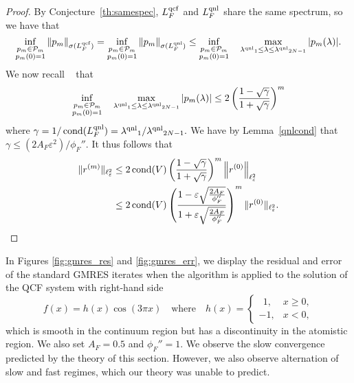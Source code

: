 \documentclass[12pt,reqno]{amsart}
\begin{document}
\begin{proof}
By Conjecture~\ref{th:samespec}, ${L^{{\rm qcf}}_F}$ and ${L^{{\rm qnl}}_F}$ share the same
spectrum, so we have that
\[
\inf_{\substack{p_{m} \in {\mathcal{P}}_{m}\\
p_m (0) = 1}} \| p_m \|_{\sigma({L^{{\rm qcf}}_F})}
=\inf_{\substack{p_{m} \in {\mathcal{P}}_{m}\\
p_m (0) = 1}} \| p_m \|_{\sigma({L^{{\rm qnl}}_F})}
\le
\inf_{\substack{p_{m} \in {\mathcal{P}}_{m}\\
p_m (0) = 1}}\quad\max_{{\lambda^{{\rm qnl}}}_{1} \leq \lambda \leq {\lambda^{{\rm qnl}}}_{2N-1}} |p_m(\lambda)|.
\]
We now recall ~\cite{saad} that
$$
\inf_{\substack{p_m \in {\mathcal{P}}_{m}\\
p_m (0) = 1}}\quad\max_{{\lambda^{{\rm qnl}}}_{1} \leq \lambda \leq {\lambda^{{\rm qnl}}}_{2N-1}} |p_m
(\lambda)|
\leq
2\left(\frac{1-\sqrt{\gamma}}{1+\sqrt{\gamma}}\right)^{m}
$$
where $\gamma=1/\operatorname{cond}({L^{{\rm qnl}}_F})={\lambda^{{\rm qnl}}}_{1}/{\lambda^{{\rm qnl}}}_{2N-1}.$
We have
by Lemma~\ref{qnlcond} that $\gamma
\le(2A_F{\varepsilon}^2)/\phi_{F}''.$
It thus follows that
\begin{equation*}
\begin{split}
\|r^{(m)}\|_{\ell^2_{\varepsilon}}&\le
2 \operatorname{cond}(V) \left(\frac{1-\sqrt{\gamma}}{1+\sqrt{\gamma}}\right)^{m}
\left\|r^{(0)}\right\|_{\ell^2_{\varepsilon}}
\\
&\le 2 \operatorname{cond}(V) \left(\frac{1-{\varepsilon}\sqrt{\frac{2A_F}{\phi_{F}''}}}{1+{\varepsilon}\sqrt{\frac{2A_F}{\phi_{F}''}}}\right)^{m}
\|r^{(0)}\|_{\ell^2_{\varepsilon}}.\qedhere
\end{split}
\end{equation*}
\end{proof}

In Figures \ref{fig:gmres_res} and \ref{fig:gmres_err}, we display the
residual and error of the standard GMRES iterates when the algorithm
is applied to the solution of the QCF system with right-hand side
\begin{equation}
  \label{eq:num_ex_rhs}
  f(x) = h(x) \cos(3 \pi x) \quad \text{where} \quad
  h(x) = \begin{cases}
    \ \ 1, & x \geq 0, \\
    -1, & x < 0,
  \end{cases}
\end{equation}
which is smooth in the continuum region but has a discontinuity in the
atomistic region.
We also set $A_F = 0.5$ and $\phi_F'' = 1$. We observe the
slow convergence predicted by the theory of this section. However, we
also observe alternation of slow and fast regimes, which our theory
was unable to predict.
\end{document}
